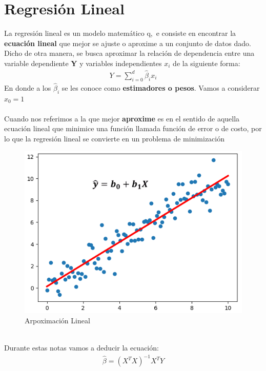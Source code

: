 \documentclass[12pt,a4paper]{book}
\begin{document}
\chapter{Regresión Lineal}
La regresión lineal es un modelo matemático q,~e consiste en encontrar la \textbf{ecuación lineal} que mejor se ajuste o aproxime a un conjunto de datos dado. Dicho de otra manera, se busca aproximar la relación de dependencia entre una variable dependiente  \textbf{Y}  y variables independientes  $x_{i}$  de la siguiente forma:
\begin{equation*}
\begin{split}
Y=\sum^{d}_{i=0}\widehat{\beta}_{i}x_{i}
\end{split}
\end{equation*}
En donde a los $\widehat{\beta}_{i}$ se les conoce como \textbf{estimadores o pesos}. Vamos a considerar $x_{0}=1$\\
\\
Cuando nos referimos a la que mejor \textbf{aproxime} es en el sentido de aquella ecuación lineal que minimice una función llamada función de error o de costo, por lo que la regresión lineal se convierte en un problema de minimización
\begin{figure}[hbtp]
\centering
\includegraphics[scale=0.7]{Graficas/RL_1.png}
\caption{Arpoximación Lineal}
\end{figure}
\\
Durante estas notas vamos a deducir la ecuación:
\begin{equation*}
\begin{split}
\widehat{\beta}=(X^{T}X)^{-1}X^{T}Y
\end{split}
\end{equation*}
\end{document}
